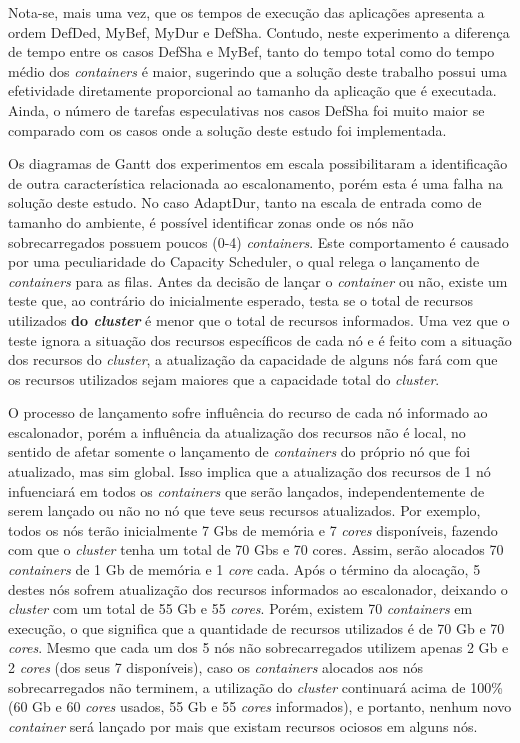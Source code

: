 Nota-se, mais uma vez, que os tempos de execução das aplicações apresenta a ordem DefDed, MyBef, MyDur e DefSha. Contudo, neste experimento a diferença de tempo entre os casos DefSha e MyBef, tanto do tempo total como do tempo médio dos \textit{containers} é maior, sugerindo que a solução deste trabalho possui uma efetividade diretamente proporcional ao tamanho da aplicação que é executada. Ainda, o número de tarefas especulativas nos casos DefSha foi muito maior se comparado com os casos onde a solução deste estudo foi implementada.

Os diagramas de Gantt dos experimentos em escala possibilitaram a identificação de outra característica relacionada ao escalonamento, porém esta é uma falha na solução deste estudo. No caso AdaptDur, tanto na escala de entrada como de tamanho do ambiente, é possível identificar zonas onde os nós não sobrecarregados possuem poucos (0-4) \textit{containers}. Este comportamento é causado por uma peculiaridade do Capacity Scheduler, o qual relega o lançamento de \textit{containers} para as filas. Antes da decisão de lançar o \textit{container} ou não, existe um teste que, ao contrário do inicialmente esperado, testa se o total de recursos utilizados \textbf{do \textit{cluster}} é menor que o total de recursos informados. Uma vez que o teste ignora a situação dos recursos específicos de cada nó e é feito com a situação dos recursos do \textit{cluster}, a atualização da capacidade de alguns nós fará com que os recursos utilizados sejam maiores que a capacidade total do \textit{cluster}.

O processo de lançamento sofre influência do recurso de cada nó informado ao escalonador, porém a influência da atualização dos recursos não é local, no sentido de afetar somente o lançamento de \textit{containers} do próprio nó que foi atualizado, mas sim global. Isso implica que a atualização dos recursos de 1 nó infuenciará em todos os \textit{containers} que serão lançados, independentemente de serem lançado ou não no nó que teve seus recursos atualizados. Por exemplo, todos os nós terão inicialmente 7 Gbs de memória e 7 \textit{cores} disponíveis, fazendo com que o \textit{cluster} tenha um total de 70 Gbs e 70 cores. Assim, serão alocados 70 \textit{containers} de 1 Gb de memória e 1 \textit{core} cada. Após o término da alocação, 5 destes nós sofrem atualização dos recursos informados ao escalonador, deixando o \textit{cluster} com um total de 55 Gb e 55 \textit{cores}. Porém, existem 70 \textit{containers} em execução, o que significa que a quantidade de recursos utilizados é de  70 Gb e 70 \textit{cores}. Mesmo que cada um dos 5 nós não sobrecarregados utilizem apenas 2 Gb e 2 \textit{cores} (dos seus 7 disponíveis), caso os \textit{containers} alocados aos nós sobrecarregados não terminem, a utilização do \textit{cluster} continuará acima de 100\% (60 Gb e 60 \textit{cores} usados, 55 Gb e 55 \textit{cores} informados), e portanto, nenhum novo \textit{container} será lançado por mais que existam recursos ociosos em alguns nós.

